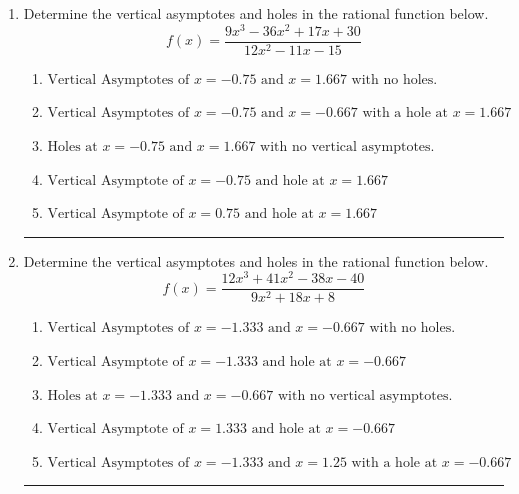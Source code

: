 \documentclass[14pt]{extbook}
\newcommand{\litem}[1]{\item#1\hspace*{-1cm}\rule{\textwidth}{0.4pt}}
\begin{document}
\begin{enumerate}
\litem{
Determine the vertical asymptotes and holes in the rational function below.\[ f(x) = \frac{9x^{3} -36 x^{2} +17 x + 30}{12x^{2} -11 x -15} \]\begin{enumerate}[label=\Alph*.]
\item \( \text{Vertical Asymptotes of } x = -0.75 \text{ and } x = 1.667 \text{ with no holes.} \)
\item \( \text{Vertical Asymptotes of } x = -0.75 \text{ and } x = -0.667 \text{ with a hole at } x = 1.667 \)
\item \( \text{Holes at } x = -0.75 \text{ and } x = 1.667 \text{ with no vertical asymptotes.} \)
\item \( \text{Vertical Asymptote of } x = -0.75 \text{ and hole at } x = 1.667 \)
\item \( \text{Vertical Asymptote of } x = 0.75 \text{ and hole at } x = 1.667 \)

\end{enumerate} }
\litem{
Determine the vertical asymptotes and holes in the rational function below.\[ f(x) = \frac{12x^{3} +41 x^{2} -38 x -40}{9x^{2} +18 x + 8} \]\begin{enumerate}[label=\Alph*.]
\item \( \text{Vertical Asymptotes of } x = -1.333 \text{ and } x = -0.667 \text{ with no holes.} \)
\item \( \text{Vertical Asymptote of } x = -1.333 \text{ and hole at } x = -0.667 \)
\item \( \text{Holes at } x = -1.333 \text{ and } x = -0.667 \text{ with no vertical asymptotes.} \)
\item \( \text{Vertical Asymptote of } x = 1.333 \text{ and hole at } x = -0.667 \)
\item \( \text{Vertical Asymptotes of } x = -1.333 \text{ and } x = 1.25 \text{ with a hole at } x = -0.667 \)


\end{enumerate}}
\end{enumerate}
\end{document}
